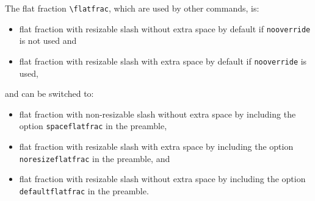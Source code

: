 \documentclass[a4paper,12pt]{article}
\begin{document}
The flat fraction \verb|\flatfrac|, which are used by other commands, is:
\begin{itemize}
\item flat fraction with resizable slash without extra space by default if \verb|nooverride| is not used and
\item flat fraction with resizable slash with extra space by default if \verb|nooverride| is used,
\end{itemize}
and can be switched to:
\begin{itemize}
\item flat fraction with non-resizable slash without extra space by including the option \texttt{spaceflatfrac} in the preamble,
\item flat fraction with resizable slash with extra space by including the option \texttt{noresizeflatfrac} in the preamble, and
\item flat fraction with resizable slash without extra space by including the option \texttt{defaultflatfrac} in the preamble.
\end{itemize}
\end{document}
